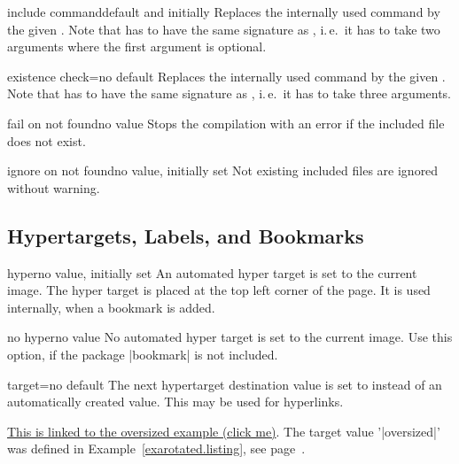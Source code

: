 \documentclass[a4paper,11pt]{ltxdoc}
\begin{document}
\begin{docIgrKey}{include command}{}{default and initially }
  Replaces the internally used  command by the given .
  Note that  has to have the same signature as ,
  i.\,e.\ it has to take two arguments where the first argument is optional.
\end{docIgrKey}

\begin{docIgrKey}{existence check}{=}{no default}
  Replaces the internally used  command by the given .
  Note that  has to have the same signature as ,
  i.\,e.\ it has to take three arguments.
\end{docIgrKey}

\begin{docIgrKey}{fail on not found}{}{no value}
  Stops the compilation with an error if the included file does not exist.
\end{docIgrKey}

\begin{docIgrKey}{ignore on not found}{}{no value, initially set}
  Not existing included files are ignored without warning.
\end{docIgrKey}


\subsection{Hypertargets, Labels, and Bookmarks}

\begin{docIgrKey}{hyper}{}{no value, initially set}
  An automated hyper target is set to the current image. The hyper target is placed
  at the top left corner of the page. It is used internally, when a bookmark is added.
\end{docIgrKey}

\begin{docIgrKey}{no hyper}{}{no value}
  No automated hyper target is set to the current image. Use this option, if
  the package |bookmark| is not included.
\end{docIgrKey}

\begin{docIgrKey}{target}{=}{no default}
  The next hypertarget destination value is set to  instead of
  an automatically created value. This may be used for hyperlinks.
\begin{dispExample}
\hyperlink{oversized}{This is linked to the oversized example (click me)}.
The target value '|oversized|' was defined in Example~\ref{exarotated.listing},
see page~\pageref{exarotated.listing}.
\end{dispExample}
\end{docIgrKey}
\end{document}
